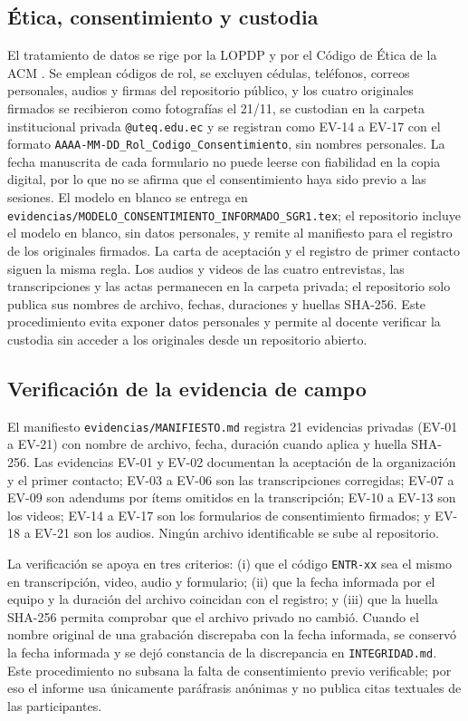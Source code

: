 \subsection{\'Etica, consentimiento y custodia}
\label{sec:custodia}
El tratamiento de datos se rige por la LOPDP \cite{lopdp2021} y por el C\'odigo de \'Etica de la ACM \cite{acm2018}. Se emplean c\'odigos de rol, se excluyen c\'edulas, tel\'efonos, correos personales, audios y firmas del repositorio p\'ublico, y los cuatro originales firmados se recibieron como fotografías el 21/11, se custodian en la carpeta institucional privada \texttt{@uteq.edu.ec} y se registran como EV-14 a EV-17 con el formato \texttt{AAAA-MM-DD\_Rol\_Codigo\_Consentimiento}, sin nombres personales. La fecha manuscrita de cada formulario no puede leerse con fiabilidad en la copia digital, por lo que no se afirma que el consentimiento haya sido previo a las sesiones. El modelo en blanco se entrega en \texttt{evidencias/MODELO\_CONSENTIMIENTO\_INFORMADO\_SGR1.tex}; el repositorio incluye el modelo en blanco, sin datos personales, y remite al manifiesto para el registro de los originales firmados. La carta de aceptaci\'on y el registro de primer contacto siguen la misma regla. Los audios y videos de las cuatro entrevistas, las transcripciones y las actas permanecen en la carpeta privada; el repositorio solo publica sus nombres de archivo, fechas, duraciones y huellas SHA-256. Este procedimiento evita exponer datos personales y permite al docente verificar la custodia sin acceder a los originales desde un repositorio abierto.

\subsection{Verificaci\'on de la evidencia de campo}
El manifiesto \texttt{evidencias/MANIFIESTO.md} registra 21 evidencias privadas (EV-01 a EV-21) con nombre de archivo, fecha, duraci\'on cuando aplica y huella SHA-256. Las evidencias EV-01 y EV-02 documentan la aceptaci\'on de la organizaci\'on y el primer contacto; EV-03 a EV-06 son las transcripciones corregidas; EV-07 a EV-09 son adendums por \'items omitidos en la transcripci\'on; EV-10 a EV-13 son los videos; EV-14 a EV-17 son los formularios de consentimiento firmados; y EV-18 a EV-21 son los audios. Ning\'un archivo identificable se sube al repositorio.

La verificaci\'on se apoya en tres criterios: (i) que el c\'odigo \texttt{ENTR-xx} sea el mismo en transcripci\'on, video, audio y formulario; (ii) que la fecha informada por el equipo y la duraci\'on del archivo coincidan con el registro; y (iii) que la huella SHA-256 permita comprobar que el archivo privado no cambi\'o. Cuando el nombre original de una grabaci\'on discrepaba con la fecha informada, se conserv\'o la fecha informada y se dej\'o constancia de la discrepancia en \texttt{INTEGRIDAD.md}. Este procedimiento no subsana la falta de consentimiento previo verificable; por eso el informe usa \'unicamente par\'afrasis an\'onimas y no publica citas textuales de las participantes.
